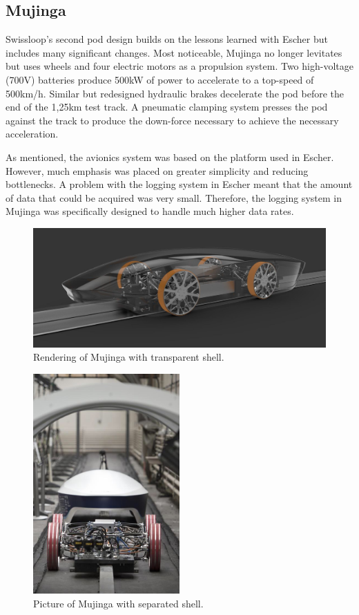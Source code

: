 \subsection{Mujinga}

Swissloop's second pod design builds on the lessons learned with Escher but includes many significant changes. Most noticeable, Mujinga no longer levitates but uses wheels and four electric motors as a propulsion system. Two high-voltage (700V) batteries produce 500kW of power to accelerate to a top-speed of 500km/h. Similar but redesigned hydraulic brakes decelerate the pod before the end of the 1,25km test track. A pneumatic clamping system presses the pod against the track to produce the down-force necessary to achieve the necessary acceleration.

As mentioned, the avionics system was based on the platform used in Escher. However, much emphasis was placed on greater simplicity and reducing bottlenecks. A problem with the logging system in Escher meant that the amount of data that could be acquired was very small. Therefore, the logging system in Mujinga was specifically designed to handle much higher data rates.

\begin{figure}[H]
  \centering \includegraphics[width=1.0\textwidth]{./figures/mujinga_transparent}
  \caption{Rendering of Mujinga with transparent shell.}
\end{figure}

\begin{figure}[H]
  \centering \includegraphics[width=0.5\textwidth]{./figures/mujinga_noshell}
  \caption{Picture of Mujinga with separated shell.}
\end{figure}

